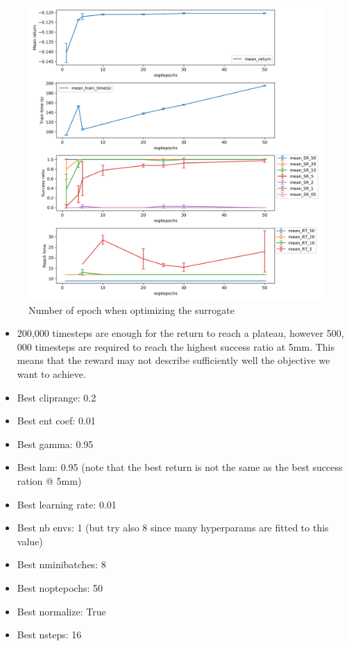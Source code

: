 \documentclass{article}
\begin{document}
\begin{figure}[H]
    \centering
    \includegraphics[width=\textwidth]{../ppo2_noptepochs.png}
\caption{Number of epoch when optimizing the surrogate}
\end{figure}



\begin{itemize}
  \item 200,000 timesteps are enough for the return to reach a plateau, however 500, 000 timesteps are required to reach the highest success ratio at 5mm. This means that the reward may not describe sufficiently well the objective we want to achieve.
  \item Best cliprange: 0.2
  \item Best ent coef: 0.01
  \item Best gamma: 0.95
  \item Best lam: 0.95 (note that the best return is not the same as the best success ration @ 5mm)
  \item Best learning rate: 0.01
  \item Best nb envs: 1 (but try also 8 since many hyperparams are fitted to this value)
  \item Best nminibatches: 8
  \item Best noptepochs: 50
  \item Best normalize: True
  \item Best nsteps: 16
\end{itemize} 
\end{document}
